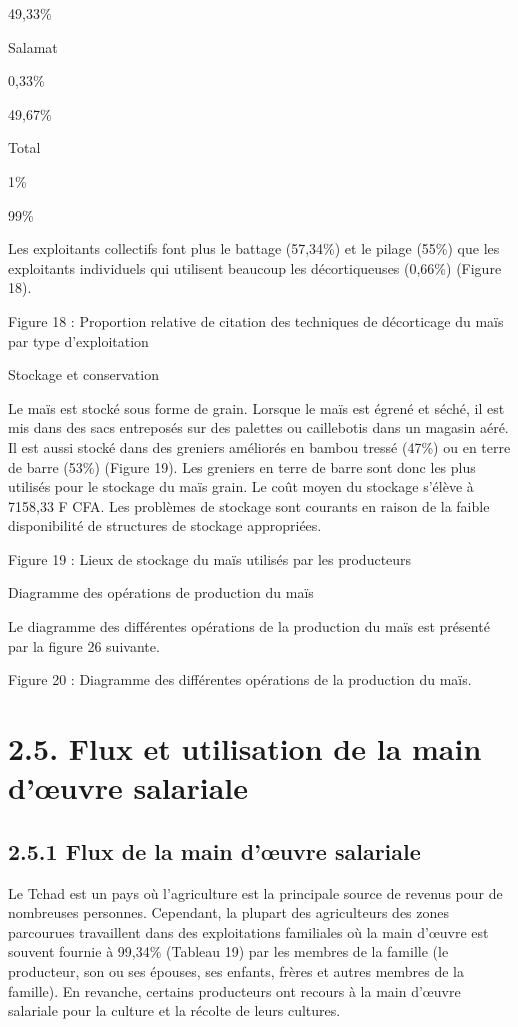 \documentclass[12pt,oneside]{report}
\begin{document}
49,33\%

Salamat

0,33\%

49,67\%

Total

1\%

99\%

Les exploitants collectifs font plus le battage (57,34\%) et le pilage (55\%) que les exploitants individuels qui utilisent beaucoup les décortiqueuses (0,66\%) (Figure 18).

Figure 18 : Proportion relative de citation des techniques de décorticage du maïs par type d’exploitation

Stockage et conservation

Le maïs est stocké sous forme de grain. Lorsque le maïs est égrené et séché, il est mis dans des sacs entreposés sur des palettes ou caillebotis dans un magasin aéré. Il est aussi stocké dans des greniers améliorés en bambou tressé (47\%) ou en terre de barre (53\%) (Figure 19). Les greniers en terre de barre sont donc les plus utilisés pour le stockage du maïs grain. Le coût moyen du stockage s’élève à 7158,33 F CFA. Les problèmes de stockage sont courants en raison de la faible disponibilité de structures de stockage appropriées.

Figure 19 : Lieux de stockage du maïs utilisés par les producteurs

Diagramme des opérations de production du maïs

Le diagramme des différentes opérations de la production du maïs est présenté par la figure 26 suivante.

Figure 20 : Diagramme des différentes opérations de la production du maïs.

\section{2.5. Flux et utilisation de la main d’œuvre salariale}
\subsection{2.5.1 Flux de la main d’œuvre salariale}
Le Tchad est un pays où l'agriculture est la principale source de revenus pour de nombreuses personnes. Cependant, la plupart des agriculteurs des zones parcourues travaillent dans des exploitations familiales où la main d'œuvre est souvent fournie à 99,34\% (Tableau 19) par les membres de la famille (le producteur, son ou ses épouses, ses enfants, frères et autres membres de la famille). En revanche, certains producteurs ont recours à la main d'œuvre salariale pour la culture et la récolte de leurs cultures.
\end{document}
